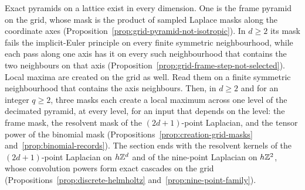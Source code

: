 \begin{enumerate}
Exact pyramids on a lattice exist in every dimension. One is the frame \Matern{} pyramid on the
grid, whose mask is the product of sampled Laplace masks along the coordinate axes
(Proposition~\ref{prop:grid-pyramid-not-isotropic}). In $d \ge 2$ its mask fails the implicit-Euler
principle on every finite symmetric neighbourhood, while each pass along one axis has it on every
such neighbourhood that contains the two neighbours on that axis
(Proposition~\ref{prop:grid-frame-step-not-selected}). Local maxima are created on the grid as well.
Read them on a finite symmetric neighbourhood that contains the axis neighbours. Then, in $d \ge 2$
and for an integer $q \ge 2$, three masks each create a local maximum across one level of the
decimated pyramid, at every level, for an input that depends on the level: the frame mask, the resolvent mask of the $(2d+1)$-point
Laplacian, and the tensor power of the binomial mask (Propositions~\ref{prop:creation-grid-masks}
and~\ref{prop:binomial-records}). The section ends with the resolvent kernels of the
$(2d+1)$-point Laplacian on $h\mathbb{Z}^d$ and of the nine-point Laplacian on $h\mathbb{Z}^2$, whose convolution
powers form exact cascades on the grid (Propositions~\ref{prop:discrete-helmholtz}
and~\ref{prop:nine-point-family}).
\end{enumerate}

